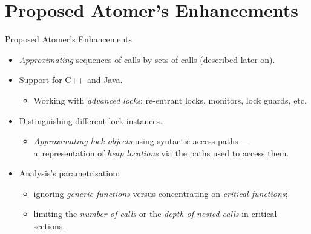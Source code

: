 \documentclass[10pt, xcolor=pdflatex, hyperref={unicode}, aspectratio=169]{beamer}
\begin{document}


\section{Proposed Atomer's Enhancements}
\begin{frame}{Proposed Atomer's Enhancements}
    \begin{itemize}\setlength\itemsep{2em}
        \item \emph{Approximating} \alert{sequences} of calls by \alert{sets} of calls (described later on). 

        \item Support for \alert{C++} and \alert{Java}.
            \medskip
            \begin{itemize}
                \item Working with \emph{advanced locks}: re-entrant locks, monitors, lock guards, etc.
            \end{itemize}

        \item Distinguishing \alert{different lock instances}.
            \medskip
            \begin{itemize}
                \item \emph{Approximating lock objects} using \alert{syntactic access paths}\,---\,a~representation of \emph{heap locations} via the paths used to access them.
            \end{itemize}

        \item Analysis's \alert{parametrisation}:
            \medskip
            \begin{itemize}\setlength\itemsep{.8em}
                \item \alert{ignoring} \emph{generic functions} versus \alert{concentrating on} \emph{critical functions};

                \item \alert{limiting} the \emph{number of calls} or the \emph{depth of nested calls} in \alert{critical sections}.
            \end{itemize}
    \end{itemize}
\end{frame}


\end{document}
